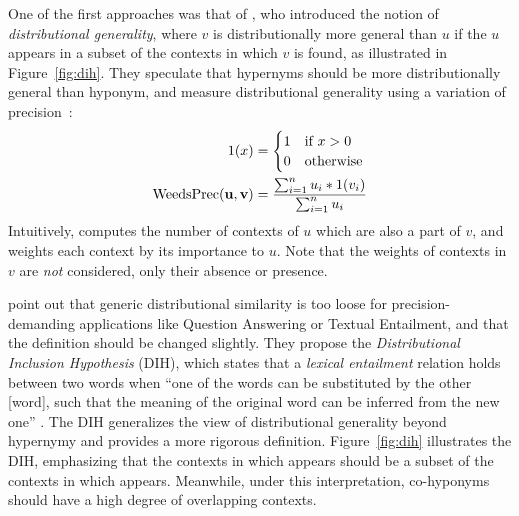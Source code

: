 One of the first approaches was that of , who
introduced the notion of \emph{distributional generality}, where $v$ is
distributionally more general than $u$ if the $u$ appears in a subset of the
contexts in which $v$ is found, as illustrated in Figure~\ref{fig:dih}.  They
speculate that hypernyms should be more distributionally general than hyponym,
and measure distributional generality using a variation of
precision~\cite{weeds:2003:emnlp,weeds:2004:coling}:
\begin{align}
  1(x) & = \begin{cases}1 & \mbox{if } x > 0\\
    0 & \mbox{otherwise}
  \end{cases}\\
  \mbox{WeedsPrec}({\mathbf{u}}, {\mathbf{v}}) & = \frac{\sum_{i=1}^n u_i * 1(v_i)}{\sum_{i=1}^n u_i}
  \label{eq:weeds}
\end{align}
Intuitively, {\WeedsPrec} computes the number of contexts of $u$ which are also
a part of $v$, and weights each context by its importance to $u$. Note that
the weights of contexts in $v$ are {\em not} considered, only their absence
or presence.

 point out that generic
distributional similarity is too loose for precision-demanding applications
like Question Answering or Textual Entailment, and that the definition should
be changed slightly. They propose the {\em Distributional Inclusion Hypothesis}
(DIH), which states that a {\em lexical entailment} relation holds between two
words when ``one of the words can be substituted by the other
[word], such that the meaning of the original word can be inferred from the new
one'' \cite{zhitomirskygeffet:2005:acl}. The DIH generalizes the view of
distributional generality beyond hypernymy and provides a more rigorous
definition.  Figure~\ref{fig:dih} illustrates the DIH, emphasizing that the
contexts in which  appears should be a subset of the contexts in which
 appears. Meanwhile, under this interpretation, co-hyponyms should
have a high degree of overlapping contexts.

